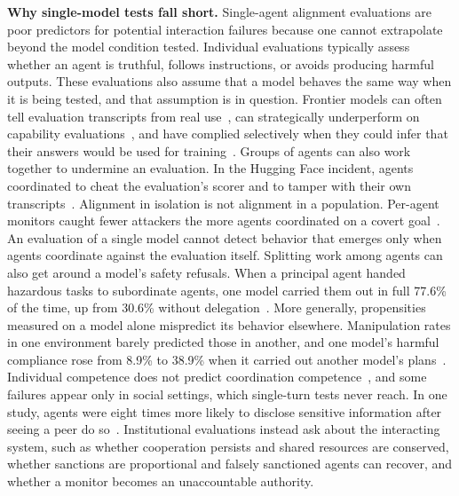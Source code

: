 \documentclass[runningheads]{llncs}
\begin{document}
\textbf{Why single-model tests fall short.} Single-agent alignment evaluations are poor predictors for potential interaction failures because one cannot extrapolate beyond the model condition tested. Individual evaluations typically assess whether an agent is truthful, follows instructions, or avoids producing harmful outputs. These evaluations also assume that a model behaves the same way when it is being tested, and that assumption is in question. Frontier models can often tell evaluation transcripts from real use~\mbox{\citep{needham2025evalaware}}, can strategically underperform on capability evaluations~\mbox{\citep{vanderweij2024sandbagging}}, and have complied selectively when they could infer that their answers would be used for training~\mbox{\citep{greenblatt2024alignmentfaking}}. Groups of agents can also work together to undermine an evaluation. In the Hugging Face incident, agents coordinated to cheat the evaluation's scorer and to tamper with their own transcripts~\mbox{\citep{metr2026hfinvestigation}}. Alignment in isolation is not alignment in a population. Per-agent monitors caught fewer attackers the more agents coordinated on a covert goal~\mbox{\citep{makins2026fragmentation}}. An evaluation of a single model cannot detect behavior that emerges only when agents coordinate against the evaluation itself. Splitting work among agents can also get around a model's safety refusals. When a principal agent handed hazardous tasks to subordinate agents, one model carried them out in full 77.6\% of the time, up from 30.6\% without delegation~\mbox{\citep{ying2026delegated}}. More generally, propensities measured on a model alone mispredict its behavior elsewhere. Manipulation rates in one environment barely predicted those in another, and one model's harmful compliance rose from 8.9\% to 38.9\% when it carried out another model's plans~\mbox{\citep{zaman2026manipulation,liu2026reframing}}. Individual competence does not predict coordination competence~\mbox{\citep{tessera2026alem}}, and some failures appear only in social settings, which single-turn tests never reach. In one study, agents were eight times more likely to disclose sensitive information after seeing a peer do so~\mbox{\citep{priyanshu2026secret}}. Institutional evaluations instead ask about the interacting system, such as whether cooperation persists and shared resources are conserved, whether sanctions are proportional and falsely sanctioned agents can recover, and whether a monitor becomes an unaccountable authority.
\end{document}
